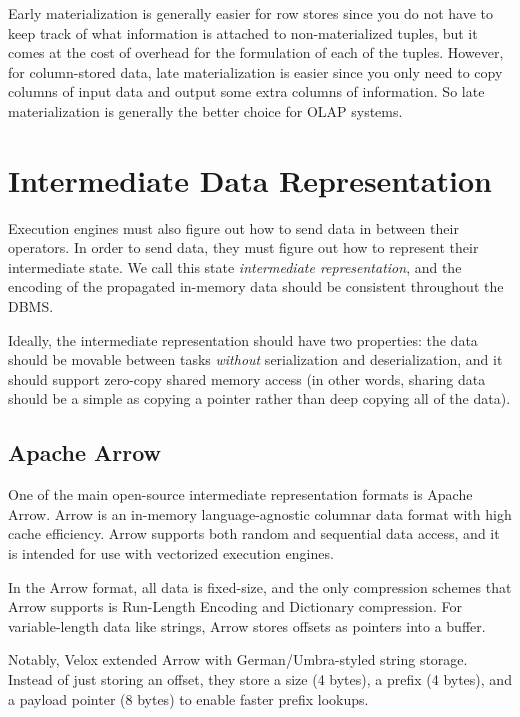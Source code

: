 \documentclass[11pt]{article}
\begin{document}
Early materialization is generally easier for row stores since you do not have
to keep track of what information is attached to non-materialized tuples,
but it comes at the cost of overhead for the formulation of each of the tuples.
However, for column-stored data, late materialization is easier since you only
need to copy columns of input data and output some extra columns of information.
So late materialization is generally the better choice for OLAP systems.




\section{Intermediate Data Representation}

Execution engines must also figure out how to send data in between their
operators. In order to send data, they must figure out how to represent their
intermediate state. We call this state \textit{intermediate representation},
and the encoding of the propagated in-memory data should be consistent
throughout the DBMS.

Ideally, the intermediate representation should have two properties:
the data should be movable between tasks \textit{without} serialization and
deserialization, and it should support zero-copy shared memory access
(in other words, sharing data should be a simple as copying a pointer rather
than deep copying all of the data).
\\

\subsection{Apache Arrow}
One of the main open-source intermediate representation formats is Apache Arrow.
Arrow is an in-memory language-agnostic columnar data format with high cache
efficiency. Arrow supports both random and sequential data access, and it is
intended for use with vectorized execution engines.

In the Arrow format, all data is fixed-size, and the only compression schemes
that Arrow supports is Run-Length Encoding and Dictionary compression.
For variable-length data like strings, Arrow stores offsets as pointers
into a buffer.

Notably, Velox extended Arrow with German/Umbra-styled string storage.
Instead of just storing an offset, they store a size (4 bytes), a prefix
(4 bytes), and a payload pointer (8 bytes) to enable faster prefix lookups.
\end{document}

